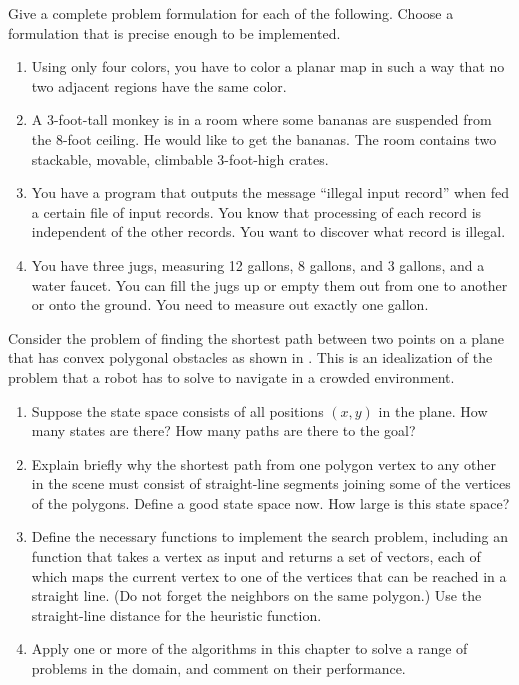 \begin{uexercise}
Give a complete problem formulation for each of the following. 
Choose a formulation that is precise enough to be implemented.
\begin{enumerate}
\item Using only four
colors, you have to color a planar map in such a way that no two adjacent regions have the same color.

\item A 3-foot-tall monkey is in a room where some bananas are suspended
from the 8-foot ceiling. He would like to get the bananas.  The room contains 
two stackable, movable, climbable 3-foot-high crates.

\item You have a program that outputs the message ``illegal input
record'' when fed a certain file of input records.  You know that
processing of each record is independent of the other records. You
want to discover what record is illegal.

\item You have three jugs, measuring 12 gallons, 8 gallons, and 3
gallons, and a water faucet.  You can fill the jugs up or empty them
out from one to another or onto the ground. You need to measure out
exactly one gallon.
\end{enumerate}
\end{uexercise} 

\begin{exercise}%
\prgex
Consider the problem of finding the shortest path
between two points on a plane that has convex polygonal obstacles as
shown in .
This is an idealization of the problem that a robot has to solve to
navigate in a crowded environment.
\begin{enumerate}
\item Suppose the state space consists of all positions \((x,y)\) in the plane. How
many states are there? How many paths are there to the goal?

\item Explain briefly why the shortest path from one polygon vertex to
any other in the scene must consist of
straight-line segments joining some of the vertices of the polygons.
Define a good state space now. How large is this state space?

\item Define the necessary functions to implement the search problem,
including an  function that takes a vertex as input and returns
a set of vectors, each of which maps the current vertex to one of the vertices that can be reached in a straight line.
(Do not forget the neighbors on the same polygon.) Use
the straight-line distance for the heuristic function.

\item Apply one or more of the algorithms in this chapter to
solve a range of problems in the domain, and comment on their performance.
\end{enumerate}
\end{exercise} 

